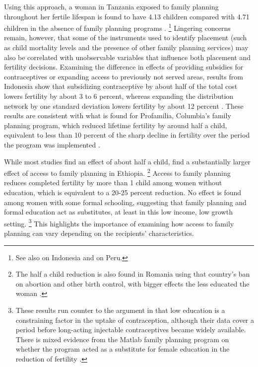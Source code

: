 \documentclass[letterpaper,12pt]{article}
\begin{document}
Using this approach, a woman in Tanzania exposed to family planning
throughout her fertile lifespan is found to have 4.13 children compared
with 4.71 children in the absence of family planning programs
\citep{angeles98}.%
\footnote{
See also \citet{Angeles2005} on Indonesia and \citep{Angeles2005a} on
Peru.} 
Lingering concerns remain, however, that some of the instruments used to
identify placement (such as child mortality levels and the presence of
other family planning services) may also be correlated with unobservable
variables that influence both placement and fertility decisions. 
Examining the difference in effects of providing subsidies for
contraceptives or expanding access to previously not served areas,
results from Indonesia show that subsidizing contraceptive by about half
of the total cost lowers fertility by about 3 to 6 percent, whereas
expanding the distribution network by one standard deviation lowers
fertility by about 12 percent \citep{Molyneaux2000}. 
These results are consistent with what is found for Profamilia,
Columbia's family planning program, which reduced lifetime fertility by
around half a child, equivalent to less than 10 percent of the sharp
decline in fertility over the period the program was implemented
\citep{Miller2010}.

While most studies find an effect of about half a child,
\citet{Portner2011} find a substantially larger effect of access to
family planning in Ethiopia.%
\footnote{
The half a child reduction is also found in Romania using that country's
ban on abortion and other birth control, with bigger effects the less
educated the woman \citep{Pop-Eleches2010}.} 
Access to family planning reduces completed fertility by more than 1
child among women without education, which is equivalent to a 20-25
percent reduction. 
No effect is found among women with some formal schooling, suggesting
that family planning and formal education act as substitutes, at least
in this low income, low growth setting.%
\footnote{
These results run counter to the argument in \citet{Feyisetan1996} that
low education is a constraining factor in the uptake of contraception,
although their data cover a period before long-acting injectable
contraceptives became widely available. 
There is mixed evidence from the Matlab family planning program on
whether the program acted as a substitute for female education in the
reduction of fertility \citep{Sinha2005,Joshi2007}.} 
This highlights the importance of examining how access to family
planning can vary depending on the recipients' characteristics.
\end{document}

